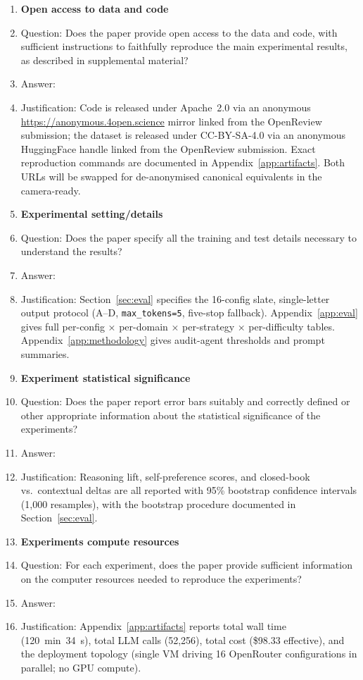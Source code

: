 \begin{enumerate}
\item {\bf Open access to data and code}
    \item[] Question: Does the paper provide open access to the data and code, with sufficient instructions to faithfully reproduce the main experimental results, as described in supplemental material?
    \item[] Answer: \answerYes{}
    \item[] Justification: Code is released under Apache~2.0 via an anonymous \url{https://anonymous.4open.science} mirror linked from the OpenReview submission; the dataset is released under CC-BY-SA-4.0 via an anonymous HuggingFace handle linked from the OpenReview submission. Exact reproduction commands are documented in Appendix~\ref{app:artifacts}. Both URLs will be swapped for de-anonymised canonical equivalents in the camera-ready.

\item {\bf Experimental setting/details}
    \item[] Question: Does the paper specify all the training and test details necessary to understand the results?
    \item[] Answer: \answerYes{}
    \item[] Justification: Section~\ref{sec:eval} specifies the 16-config slate, single-letter output protocol (A--D, \texttt{max\_tokens=5}, five-stop fallback). Appendix~\ref{app:eval} gives full per-config × per-domain × per-strategy × per-difficulty tables. Appendix~\ref{app:methodology} gives audit-agent thresholds and prompt summaries.

\item {\bf Experiment statistical significance}
    \item[] Question: Does the paper report error bars suitably and correctly defined or other appropriate information about the statistical significance of the experiments?
    \item[] Answer: \answerYes{}
    \item[] Justification: Reasoning lift, self-preference scores, and closed-book vs.\ contextual deltas are all reported with 95\% bootstrap confidence intervals (1{,}000 resamples), with the bootstrap procedure documented in Section~\ref{sec:eval}.

\item {\bf Experiments compute resources}
    \item[] Question: For each experiment, does the paper provide sufficient information on the computer resources needed to reproduce the experiments?
    \item[] Answer: \answerYes{}
    \item[] Justification: Appendix~\ref{app:artifacts} reports total wall time (120~min~34~s), total LLM calls (52{,}256), total cost (\$98.33 effective), and the deployment topology (single VM driving 16 OpenRouter configurations in parallel; no GPU compute).


\end{enumerate}
